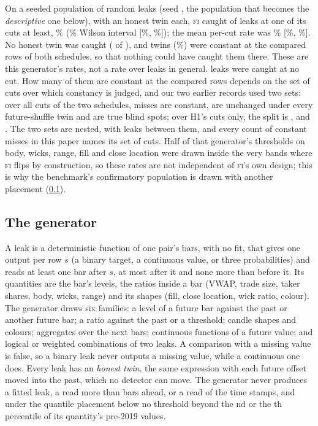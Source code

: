 \documentclass[11pt]{article}
\newcommand{\FI}{\textsc{fi}}
\newcommand{\pct}{\%}
\begin{document}
On a seeded population of \NumAdvN{} random leaks (seed \NumAdvSeed, the population that becomes
the \emph{descriptive} one below), with an honest twin each, \FI{} caught \NumAdvCaught{} of
\NumAdvTotal{} leaks at one of its \NumAdvCuts{} cuts at least, \NumAdvRate\pct{}
(\NumConf\pct{} Wilson interval [\NumAdvRateLo\pct, \NumAdvRateHi\pct]); the mean per-cut rate
was \NumAdvPerCut\pct{} [\NumAdvPerCutLo\pct, \NumAdvPerCutHi\pct]. No honest twin was caught
(\NumAdvTwinsCaught{} of \NumAdvTwinsTotal), and \NumAdvTwinsConst{} twins (\NumAdvTwinsConstPct\pct)
were constant at the compared rows of both schedules, so that nothing could have caught them there. These are this
generator's rates, not a rate over leaks in general. \NumAdvMissed{} leaks were caught at no cut.
How many of them are constant at the compared rows depends on the set of cuts over which constancy
is judged, and our two earlier records used two sets: over all \NumCorrAllCuts{} cuts of the two
schedules, \NumCorrBothConst{} misses are constant, \NumCorrBothUnch{} are unchanged under every
future-shuffle twin and \NumCorrBothBlind{} are true blind spots; over H1's \NumHoneCutsN{} cuts
only, the split is \NumCorrHoneConst{}, \NumCorrHoneUnch{} and \NumCorrHoneBlind. The two sets are
nested, with \NumCorrBetween{} leaks between them, and every count of constant misses in this paper
names its set of cuts. Half of that generator's thresholds on body, wicks, range, fill and close location were
drawn inside the very bands where \FI{} flips by construction, so these rates are not independent of
\FI's own design; this is why the benchmark's confirmatory population is drawn with another
placement (\cref{sec:generator}).

\subsection{The generator}\label{sec:generator}
A leak is a deterministic function of one pair's bars, with no fit, that gives one output per row
$s$ (a binary target, a continuous value, or three probabilities) and reads at least one bar after
$s$, at most \NumReach{} after it and none more than \NumDeepestRead{} before it. Its quantities
are the bar's levels, the ratios inside a bar (VWAP, trade size, taker shares, body, wicks, range)
and its shapes (fill, close location, wick ratio, colour). The generator draws six families: a
level of a future bar against the past or another future bar; a ratio against the past or a
threshold; candle shapes and colours; aggregates over the next bars; continuous functions of a
future value; and logical or weighted combinations of two leaks. A comparison with a missing value
is false, so a binary leak never outputs a missing value, while a continuous one does. Every leak
has an \emph{honest twin}, the same expression with each future offset moved into the past, which
no detector can move. The generator never produces a fitted leak, a read more than \NumReach{} bars
ahead, or a read of the time stamps, and under the quantile placement below no threshold beyond the
\NumNeverLo{}nd or the \NumNeverHi{}th percentile of its quantity's pre-2019 values.
\end{document}
